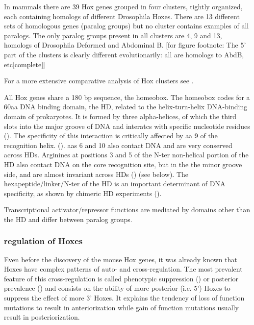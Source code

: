 In mammals there are 39 Hox genes grouped in four clusters, tightly organized, each containing homologs of different Drosophila Hoxes. There are 13 different sets of homologous genes (paralog groups) but no cluster contains examples of all paralogs. The only paralog groups present in all clusters are 4, 9 and 13, homologs of Drosophila Deformed and Abdominal B. [for figure footnote: The 5' part of the clusters is clearly different evolutionarily: all are homologs to AbdB, etc[complete]] 

For a more extensive comparative analysis of Hox clusters see \cite{Duboule2007}.

All Hox genes share a 180 bp sequence, the homeobox. The homeobox codes for a 60aa DNA binding domain, the \ac{HD}, related to the helix-turn-helix DNA-binding domain of prokaryotes. It is formed by three alpha-helices, of which the third slots into the major groove of DNA and interatcs with specific nucleotide residues (\cite{Treisman1992}). The specificity of this interaction is critically affected by \ac{aa} 9 of the recognition helix. (\cite{Treisman1992}). \acp{aa} 6 and 10 also contact DNA and are very conserved across \acp{HD}. Arginines at positions 3 and 5 of the \ac{N-ter} non-helical portion of the \ac{HD} also contact DNA on the core recognition site, but in the the minor groove side, and are almost invariant across \acp{HD} (\cite{Treisman1992}) (see below). The hexapeptide/linker/\ac{N-ter} of the \ac{HD} is an important determinant of DNA specificity, as shown by chimeric \ac{HD} experiments (\cite{Chang1996}).

Transcriptional activator/repressor functions are mediated by domains other than the \ac{HD} and differ between paralog groups.

\subsubsection{regulation of Hoxes}

Even before the discovery of the mouse Hox genes, it was already known that Hoxes have complex patterns of auto- and cross-regulation. The most prevalent feature of this cross-regulation is called phenotypic suppression (\cite{Gonzalez-Reyes1990}) or posterior prevalence (\cite{Lufkin1991}) and consists on the ability of more posterior (i.e. 5') Hoxes to suppress the effect of more 3' Hoxes. It explains the tendency of loss of function mutations to result in anteriorization while gain of function mutations usually result in posteriorization.

